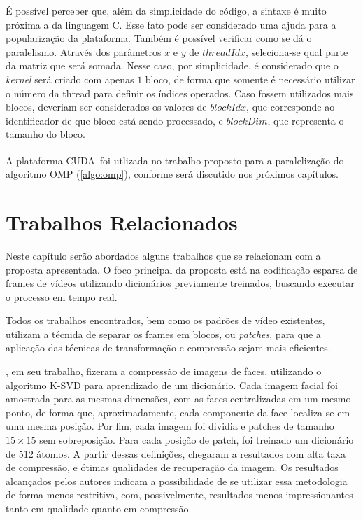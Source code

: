 \documentclass[cic,tc]{iiufrgs}
\newcommand{\reg}{\textsuperscript{\textregistered}}
\begin{document}
É possível perceber que, além da simplicidade do código, a sintaxe é muito próxima a
da linguagem C. 
Esse fato pode ser considerado uma ajuda para a popularização da plataforma.
Também é possível verificar como se dá o paralelismo. 
Através dos parâmetros $x$ e $y$ de $threadIdx$, seleciona-se qual parte da matriz que 
será somada. 
Nesse caso, por simplicidade, é considerado que o \textit{kernel} será criado com apenas
$1$ bloco, de forma que somente é necessário utilizar o número da thread para definir 
os índices operados.
Caso fossem utilizados mais blocos, deveriam ser considerados os valores de $blockIdx$, 
que corresponde ao identificador de que bloco está sendo processado, e $blockDim$, que 
representa o tamanho do bloco.

A plataforma CUDA\reg~foi utlizada no trabalho proposto para a paralelização do algoritmo
OMP (\autoref{algo:omp}), conforme será discutido nos próximos capítulos.


\chapter{Trabalhos Relacionados}
Neste capítulo serão abordados alguns trabalhos que se relacionam com a proposta apresentada.
O foco principal da proposta está na codificação esparsa de frames de vídeos utilizando dicionários
previamente treinados, buscando executar o processo em tempo real.

Todos os trabalhos encontrados, bem como os padrões de vídeo existentes,
utilizam a técnida de separar os frames em blocos, ou \textit{patches},
para que a aplicação das técnicas de transformação e compressão sejam 
mais eficientes.

\citet{BRYTFACEKSVD}, em seu trabalho, fizeram a compressão de imagens de faces, 
utilizando o algoritmo K-SVD para aprendizado de um dicionário. 
Cada imagem facial foi amostrada para as mesmas dimensões, com as faces centralizadas
em um mesmo ponto, de forma que, aproximadamente, cada componente da face localiza-se
em uma mesma posição.
Por fim, cada imagem foi dividia e patches de tamanho $15\times 15$ sem sobreposição.
Para cada posição de patch, foi treinado um dicionário
de 512 átomos. A partir dessas definições, \citet{BRYTFACEKSVD} chegaram a resultados 
com alta taxa de compressão, e ótimas qualidades de recuperação da imagem.
Os resultados alcançados pelos autores indicam a possibilidade de se utilizar essa
metodologia de forma menos restritiva, com, possivelmente, resultados menos impressionantes
tanto em qualidade quanto em compressão.
\end{document}
